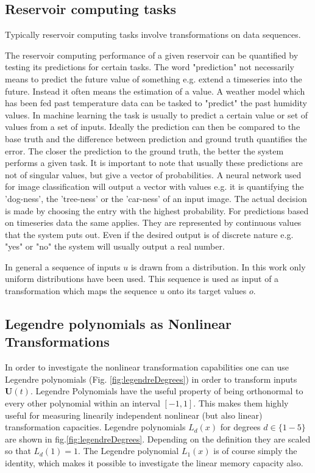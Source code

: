 \subsection{Reservoir computing tasks}

Typically reservoir computing tasks involve transformations on data sequences.

The reservoir computing performance of a given reservoir can be quantified by testing its predictions for certain tasks. The word "prediction" not necessarily means to predict the future value of something e.g. extend a timeseries into the future. Instead it often means the estimation of a value. A weather model which has been fed past temperature data can be tasked to "predict" the past humidity values. In machine learning the task is usually to predict a certain value or set of values from a set of inputs. Ideally the prediction can then be compared to the base truth and the difference between prediction and ground truth quantifies the error. The closer the prediction to the ground truth, the better the system performs a given task. 
It is important to note that usually these predictions are not of singular values, but give a vector of probabilities. A neural network used for image classification will output a vector with values e.g. it is quantifying the 'dog-ness', the 'tree-ness' or the 'car-ness' of an input image. The actual decision is made by choosing the entry with the highest probability. 
For predictions based on timeseries data the same applies. They are represented by continuous values that the system puts out. Even if the desired output is of discrete nature e.g. "yes" or "no" the system will usually output a real number. 

In general a sequence of inputs $u$ is drawn from a distribution. In this work only uniform distributions have been used. This sequence is used as input of a transformation which maps the sequence $u$ onto its target values $o$.


\subsection{Legendre polynomials as Nonlinear Transformations}

In order to investigate the nonlinear transformation capabilities one can use Legendre polynomials  (Fig. \ref{fig:legendreDegrees}) in order to transform inputs $\textbf{U}(t)$. Legendre Polynomials have the useful property of being orthonormal to every other polynomial within an interval $\left[-1,1\right]$. This makes them highly useful for measuring linearily independent nonlinear (but also linear) transformation capacities. Legendre polynomials $L_{d}(x)$ for degrees $d \in \{1-5\}$ are shown in fig.\ref{fig:legendreDegrees}. Depending on the definition they are scaled so that $L_{d}(1)=1$. The Legendre polynomial $L_{1}(x)$ is of course simply the identity, which makes it possible to investigate the linear memory capacity also.

